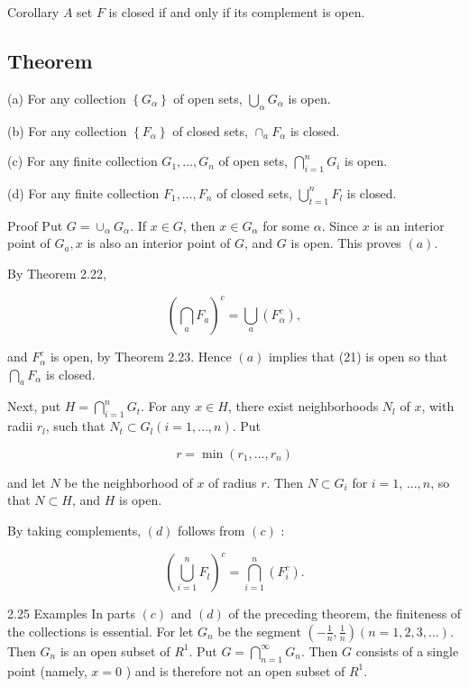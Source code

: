 \documentclass[10pt]{article}
\begin{document}
Corollary $A$ set $F$ is closed if and only if its complement is open.

\subsection{Theorem}
(a) For any collection $\left\{G_{\alpha}\right\}$ of open sets, $\bigcup_{\alpha} G_{\alpha}$ is open.

(b) For any collection $\left\{F_{\alpha}\right\}$ of closed sets, $\cap_{a} F_{\alpha}$ is closed.

(c) For any finite collection $G_{1}, \ldots, G_{n}$ of open sets, $\bigcap_{i=1}^{n} G_{i}$ is open.

(d) For any finite collection $F_{1}, \ldots, F_{n}$ of closed sets, $\bigcup_{t=1}^{n} F_{l}$ is closed.

Proof Put $G=\cup_{\alpha} G_{\alpha}$. If $x \in G$, then $x \in G_{\alpha}$ for some $\alpha$. Since $x$ is an interior point of $G_{a}, x$ is also an interior point of $G$, and $G$ is open. This proves $(a)$.

By Theorem 2.22,

$$
\left(\bigcap_{a} F_{a}\right)^{c}=\bigcup_{a}\left(F_{\alpha}^{c}\right),
$$

and $F_{\alpha}^{c}$ is open, by Theorem 2.23. Hence $(a)$ implies that (21) is open so that $\bigcap_{a} F_{\alpha}$ is closed.

Next, put $H=\bigcap_{i=1}^{n} G_{t}$. For any $x \in H$, there exist neighborhoods $N_{l}$ of $x$, with radii $r_{l}$, such that $N_{t} \subset G_{l}(i=1, \ldots, n)$. Put

$$
r=\min \left(r_{1}, \ldots, r_{n}\right)
$$

and let $N$ be the neighborhood of $x$ of radius $r$. Then $N \subset G_{i}$ for $i=1$, $\ldots, n$, so that $N \subset H$, and $H$ is open.

By taking complements, $(d)$ follows from $(c)$ :

$$
\left(\bigcup_{i=1}^{n} F_{l}\right)^{c}=\bigcap_{i=1}^{n}\left(F_{i}^{c}\right) .
$$

2.25 Examples In parts $(c)$ and $(d)$ of the preceding theorem, the finiteness of the collections is essential. For let $G_{n}$ be the segment $\left(-\frac{1}{n}, \frac{1}{n}\right)(n=1,2,3, \ldots)$. Then $G_{n}$ is an open subset of $R^{1}$. Put $G=\bigcap_{n=1}^{\infty} G_{n}$. Then $G$ consists of a single point (namely, $x=0$ ) and is therefore not an open subset of $R^{1}$.
\end{document}
